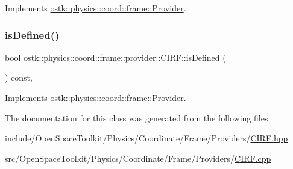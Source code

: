 Implements \hyperlink{classostk_1_1physics_1_1coord_1_1frame_1_1_provider_a38b86a589f46f8b8a9c97ab2776f37d1}{ostk\+::physics\+::coord\+::frame\+::\+Provider}.

\mbox{\label{classostk_1_1physics_1_1coord_1_1frame_1_1provider_1_1_c_i_r_f_affec3924a864a0d793ee5aa887a06cf8}} 
\subsubsection{\texorpdfstring{is\+Defined()}{isDefined()}}
{\footnotesize\ttfamily bool ostk\+::physics\+::coord\+::frame\+::provider\+::\+C\+I\+R\+F\+::is\+Defined (\begin{DoxyParamCaption}{ }\end{DoxyParamCaption}) const\hspace{0.3cm}{\ttfamily [override]}, {\ttfamily [virtual]}}



Implements \hyperlink{classostk_1_1physics_1_1coord_1_1frame_1_1_provider_a27acab0012649796b97956fed1a91493}{ostk\+::physics\+::coord\+::frame\+::\+Provider}.



The documentation for this class was generated from the following files\+:\begin{DoxyCompactItemize}
\item 
include/\+Open\+Space\+Toolkit/\+Physics/\+Coordinate/\+Frame/\+Providers/\hyperlink{_c_i_r_f_8hpp}{C\+I\+R\+F.\+hpp}\item 
src/\+Open\+Space\+Toolkit/\+Physics/\+Coordinate/\+Frame/\+Providers/\hyperlink{_c_i_r_f_8cpp}{C\+I\+R\+F.\+cpp}\end{DoxyCompactItemize}
